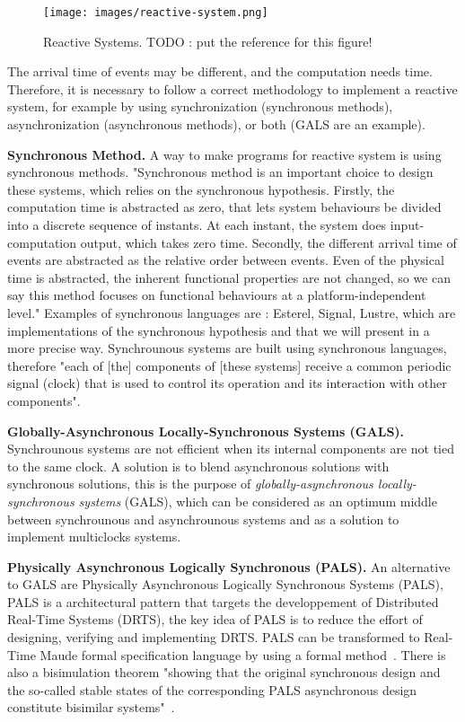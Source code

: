 \begin{figure}[H]
\centering
\texttt{[image: images/reactive-system.png]}
\caption{Reactive Systems. {\color{red}TODO : put the reference for this figure!}}
\end{figure}

The arrival time of events may be different, and the computation needs time. Therefore, it is necessary to follow a correct methodology to implement a reactive system, for example by using synchronization  (synchronous methods), asynchronization (asynchronous methods), or both (GALS are an example).

\bigskip
\noindent\textbf{Synchronous Method.} A way to make programs for reactive system is using synchronous methods. "Synchronous method is an important choice to design these systems, which relies on the synchronous hypothesis. Firstly, the computation time is abstracted as zero, that lets system behaviours be divided into a discrete sequence of instants. At each instant, the system does input-computation output, which takes zero time. Secondly, the different arrival time of events are abstracted as the relative order between events. Even of the physical time is abstracted, the inherent functional properties are not changed, so we can say this method focuses on functional behaviours at a platform-independent level."\cite{SignalPaper} Examples of synchronous languages are : Esterel, Signal, Lustre, which are implementations of the synchronous hypothesis and that we will present in a more precise way. Synchrounous systems are built using synchronous languages, therefore "each of [the] components of [these systems] receive a common periodic signal (clock) that is used to control its operation and its interaction with other components"\cite{GalsArticle}.

\bigskip
\noindent\textbf{Globally-Asynchronous Locally-Synchronous Systems (GALS).} Synchrounous systems are not efficient when its internal components are not tied to the same clock. A solution is to blend asynchronous solutions with synchronous solutions, this is the purpose of \textit{globally-asynchronous locally-synchronous systems} (GALS), which can be considered  as an optimum middle between synchrounous and asynchrounous systems and as a solution to implement multiclocks systems. 

\bigskip
\noindent\textbf{Physically Asynchronous Logically Synchronous (PALS).} An alternative to GALS are Physically Asynchronous Logically Synchronous Systems (PALS), PALS is a architectural pattern that targets the developpement of Distributed Real-Time Systems (DRTS), the key idea of PALS is to reduce the effort of designing, verifying and implementing DRTS. PALS can be transformed to Real-Time Maude formal specification language by using a formal method~\cite{PALSPaper}. There is also a bisimulation theorem "showing that the original synchronous design and the so-called stable states of the corresponding PALS asynchronous design constitute bisimilar systems"~\cite{PALSPaper}.



